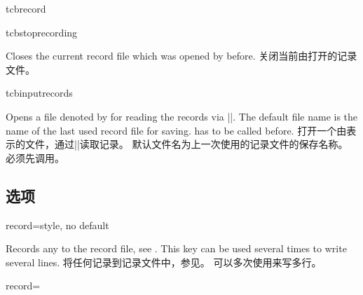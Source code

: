 \begin{docCommand}[doc new=2014-11-28]{tcbrecord}{}

\begin{dispListing}
\end{dispListing}
\end{docCommand}

\begin{docCommand}[doc new=2014-11-28]{tcbstoprecording}{}
\begin{stripedbox}
Closes the current record file which was opened by  before.
\tcblower
关闭当前由打开的记录文件。
\end{stripedbox}
\end{docCommand}

\begin{docCommand}[doc new=2014-11-28]{tcbinputrecords}{}
\begin{stripedbox}
Opens a file denoted by  for reading the records via ||.
The default file name is the name of the last used record file for saving.
 has to be called before.
\tcblower
打开一个由表示的文件，通过||读取记录。%
默认文件名为上一次使用的记录文件的保存名称。%
必须先调用。
\end{stripedbox}
\end{docCommand}

\subsection{选项}\label{sec:recording-options}
\begin{docTcbKey}[][doc new=2014-11-28]{record}{=}{style, no default}
\begin{stripedbox}
Records any  to the record file, see .
This key can be used several times to write several lines.
\tcblower
将任何记录到记录文件中，参见。%
可以多次使用来写多行。
\end{stripedbox}
  
  \begin{dispListing}
  record={\string{}}
  \end{dispListing}
\end{docTcbKey}

